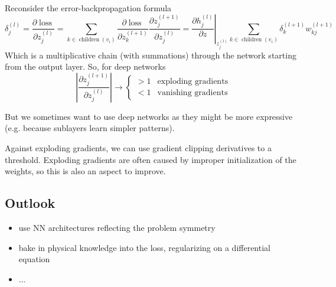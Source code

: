Reconsider the error-backpropagation formula
\begin{equation}
    \delta_j^{(l)}=\frac{\partial \operatorname{loss}}{\partial z_j^{(l)}}=\sum_{k \in \operatorname{children}\left(v_i\right)} \frac{\partial \operatorname{loss}}{\partial z_k^{(l+1)}} \frac{\partial z_j^{(l+1)}}{\partial z_j^{(l)}}=\left.\frac{\partial h_j^{(l)}}{\partial z}\right|_{z_j^{(l)}} \sum_{k \in \operatorname{children}\left(v_i\right)} \delta_k^{(l+1)} w_{k j}^{(l+1)}
\end{equation}
Which is a multiplicative chain (with summations) through the network starting from 
the output layer. So, for deep networks
\begin{equation}
    \left| \frac{\partial z_j^{(l+1)}}{\partial z_j^{(l)}} \right| \rightarrow \begin{cases}
        > 1 & \text{exploding gradients} \\
        < 1 & \text{vanishing gradients}
    \end{cases}
\end{equation}

But we sometimes want to use deep networks as they might be more expressive (e.g.
because sublayers learn simpler patterns).


Against exploding gradients, we can use gradient clipping derivatives to a threshold. Exploding
gradients are often caused by improper initialization of the weights, so this is also
an aspect to improve.

\subsection{Outlook}
\begin{itemize}
    \item use NN architectures reflecting the problem symmetry
    \item bake in physical knowledge into the loss, regularizing on a differential equation
    \item ...
\end{itemize}


\pagebreak